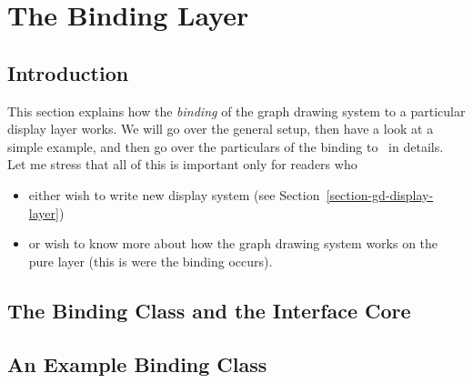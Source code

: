 %
%
%


\section{The Binding Layer}

\label{section-gd-binding-layer}

\label{section-base-graphdrawing}
\label{section-gd-internals}

\subsection{Introduction}

This section explains how the \emph{binding} of the graph drawing
system to a particular display layer works. We will go over the
general setup, then have a look at a simple example, and then go over
the particulars of the binding to \pgfname\ in details. Let me stress
that all of this is important only for readers who
\begin{itemize}
\item either wish to write new display system (see
  Section~\ref{section-gd-display-layer})
\item or wish to know more about how the graph drawing system works on
  the pure \pgfname layer (this is were the binding occurs). 
\end{itemize}



\subsection{The Binding Class and the Interface Core}



\subsection{An Example Binding Class}

